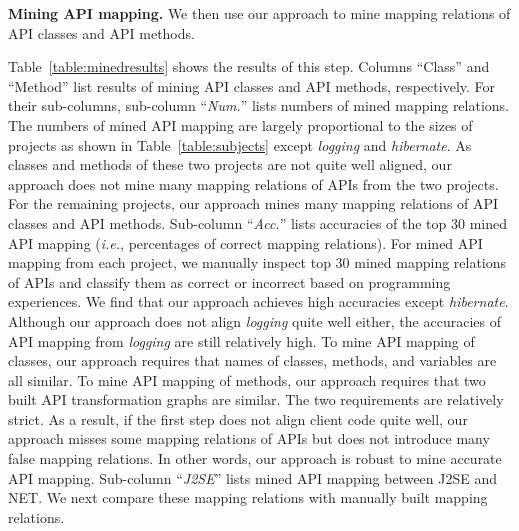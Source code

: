 \textbf{Mining API mapping.} We then use our approach to mine
mapping relations of API classes and API methods.

Table~\ref{table:minedresults} shows the results of this step.
Columns ``Class'' and ``Method'' list results of mining API classes
and API methods, respectively. For their sub-columns, sub-column
``\emph{Num.}'' lists numbers of mined mapping relations. The
numbers of mined API mapping are largely proportional to the sizes
of projects as shown in Table~\ref{table:subjects} except
\emph{logging} and \emph{hibernate}. As classes and methods of these
two projects are not quite well aligned, our approach does not mine
many mapping relations of APIs from the two projects. For the
remaining projects, our approach mines many mapping relations of API
classes and API methods. Sub-column ``\emph{Acc.}'' lists accuracies
of the top 30 mined API mapping (\emph{i.e.}, percentages of correct
mapping relations). For mined API mapping from each project, we
manually inspect top 30 mined mapping relations of APIs and classify
them as correct or incorrect based on programming experiences. We
find that our approach achieves high accuracies except
\emph{hibernate}. Although our approach does not align
\emph{logging} quite well either, the accuracies of API mapping from
\emph{logging} are still relatively high. To mine API mapping of
classes, our approach requires that names of classes, methods, and
variables are all similar. To mine API mapping of methods, our
approach requires that two built API transformation graphs are
similar. The two requirements are relatively strict. As a result, if
the first step does not align client code quite well, our approach
misses some mapping relations of APIs but does not introduce many
false mapping relations. In other words, our approach is robust to
mine accurate API mapping. Sub-column ``\emph{J2SE}'' lists mined
API mapping between J2SE and NET. We next compare these mapping
relations with manually built mapping relations.

